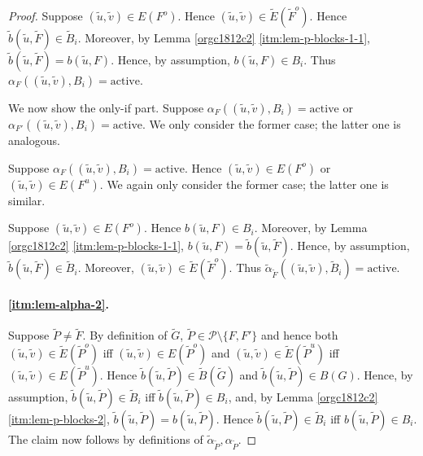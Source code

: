 \documentclass[fontsize=11pt,paper=a4]{book}
\begin{document}
\begin{proof}
Suppose \((\tilde{u},\tilde{v})\in E(F^o)\).
Hence \((\tilde{u},\tilde{v})\in\tilde{E}(\tilde{F}^o)\).
Hence \(\tilde{b}(\tilde{u},\tilde{F})\in\tilde{B}_i\).
Moreover, by Lemma \ref{orgc1812c2} \ref{itm:lem-p-blocks-1-1}, \(\tilde{b}(\tilde{u},\tilde{F})=b(\tilde{u},F)\).
Hence, by assumption, \(b(\tilde{u},F)\in B_i\).
Thus \(\alpha_F((\tilde{u},\tilde{v}),B_i)=\mathrm{active}\).

We now show the only-if part.
Suppose \(\alpha_F((\tilde{u},\tilde{v}),B_i)=\mathrm{active}\) or \(\alpha_{F'}((\tilde{u},\tilde{v}),B_i)=\mathrm{active}\).
We only consider the former case; the latter one is analogous.

Suppose \(\alpha_F((\tilde{u},\tilde{v}),B_i)=\mathrm{active}\).
Hence \((\tilde{u},\tilde{v})\in E(F^o)\) or \((\tilde{u},\tilde{v})\in E(F^u)\).
We again only consider the former case; the latter one is similar.

Suppose \((\tilde{u},\tilde{v})\in E(F^o)\).
Hence \(b(\tilde{u},F)\in B_i\).
Moreover, by Lemma \ref{orgc1812c2} \ref{itm:lem-p-blocks-1-1}, \(b(\tilde{u},F)=\tilde{b}(\tilde{u},\tilde{F})\).
Hence, by assumption, \(\tilde{b}(\tilde{u},\tilde{F})\in\tilde{B}_i\).
Moreover, \((\tilde{u},\tilde{v})\in\tilde{E}(\tilde{F}^o)\).
Thus \(\tilde{\alpha}_{\tilde{F}}((\tilde{u},\tilde{v}),\tilde{B}_i)=\mathrm{active}\).

\paragraph{\ref{itm:lem-alpha-2}.}
Suppose \(\tilde{P}\neq\tilde{F}\).
By definition of \(\tilde{G}\), \(\tilde{P}\in\mathcal{P}\setminus\{F,F'\}\) and hence both \((\tilde{u},\tilde{v})\in\tilde{E}(\tilde{P}^o)\) iff \((\tilde{u},\tilde{v})\in E(\tilde{P}^o)\) and \((\tilde{u},\tilde{v})\in\tilde{E}(\tilde{P}^u)\) iff \((\tilde{u},\tilde{v})\in E(\tilde{P}^u)\).
Hence \(\tilde{b}(\tilde{u},\tilde{P})\in\tilde{B}(\tilde{G})\) and \(\tilde{b}(\tilde{u},\tilde{P})\in B(G)\).
Hence, by assumption, \(\tilde{b}(\tilde{u},\tilde{P})\in\tilde{B}_i\) iff \(\tilde{b}(\tilde{u},\tilde{P})\in B_i\), and, by Lemma \ref{orgc1812c2} \ref{itm:lem-p-blocks-2}, \(\tilde{b}(\tilde{u},\tilde{P})=b(\tilde{u},\tilde{P})\).
Hence \(\tilde{b}(\tilde{u},\tilde{P})\in\tilde{B}_i\) iff \(b(\tilde{u},\tilde{P})\in B_i\).
The claim now follows by definitions of \(\tilde{\alpha}_{\tilde{P}},\alpha_{\tilde{P}}\).
\end{proof}
\end{document}
